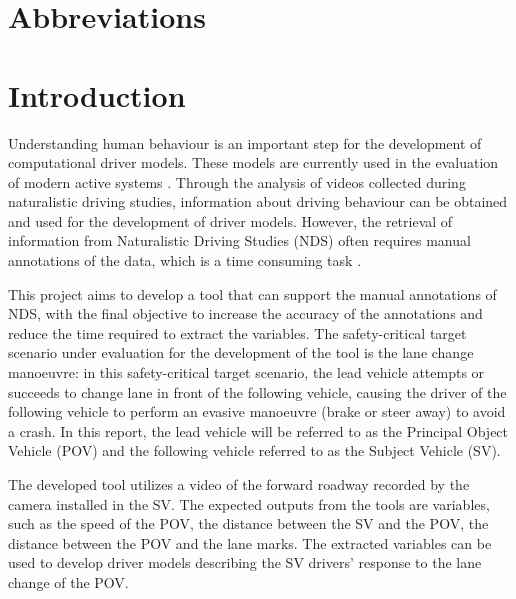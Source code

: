 \documentclass[a4paper]{article}
\begin{document}

\newpage
\tableofcontents
\newpage
{}

\section*{Abbreviations}


\newpage

\section{Introduction}
\label{sec:Intro}
Understanding human behaviour is an important step for the development of computational driver models. These models are currently used in the evaluation of modern active  systems \cite{bargman2017counterfactual}. Through the analysis of  videos collected during naturalistic driving studies, information about driving behaviour can be obtained and used for the development of driver models. However, the retrieval of information from Naturalistic Driving Studies (NDS) often requires manual annotations of the data, which is a time consuming task \cite{DOZZA2013298}.

This project aims to develop a tool that can support the manual annotations of NDS, with the final objective to increase the accuracy of the annotations and reduce the time required to extract the variables. The safety-critical target scenario under evaluation for the development of the tool is the lane change manoeuvre: in this safety-critical target scenario, the lead vehicle  attempts or succeeds to change lane in front of the following vehicle, causing the driver of the following vehicle to perform an evasive manoeuvre (brake or steer away) to avoid a crash. In this report, the lead vehicle will be referred to as the Principal Object Vehicle (POV) and the following vehicle referred to as the Subject Vehicle (SV). 

The developed tool utilizes a video of the forward roadway recorded by the camera installed in the SV. The expected outputs from the tools are variables, such as the speed of the POV, the distance between the SV and the POV, the distance between the POV and the lane marks. The extracted variables can be used to develop driver models describing the SV drivers' response to the lane change of the POV.
\end{document}

